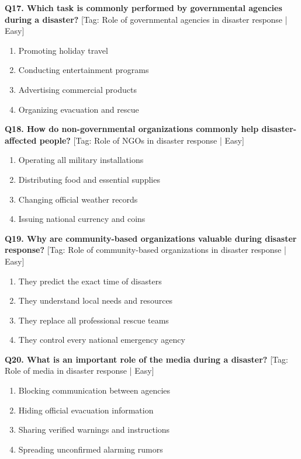 \noindent\textbf{Q17. Which task is commonly performed by governmental agencies during a disaster?} \hfill [Tag: Role of governmental agencies in disaster response | Easy]
\begin{enumerate}[label=(\alph*),topsep=2pt,itemsep=1pt,partopsep=0pt,parsep=0pt]
    \item {Promoting holiday travel}
    \item {Conducting entertainment programs}
    \item {Advertising commercial products}
    \item {Organizing evacuation and rescue}
\end{enumerate}
\vspace{2mm}

\noindent\textbf{Q18. How do non-governmental organizations commonly help disaster-affected people?} \hfill [Tag: Role of NGOs in disaster response | Easy]
\begin{enumerate}[label=(\alph*),topsep=2pt,itemsep=1pt,partopsep=0pt,parsep=0pt]
    \item {Operating all military installations}
    \item {Distributing food and essential supplies}
    \item {Changing official weather records}
    \item {Issuing national currency and coins}
\end{enumerate}
\vspace{2mm}

\noindent\textbf{Q19. Why are community-based organizations valuable during disaster response?} \hfill [Tag: Role of community-based organizations in disaster response | Easy]
\begin{enumerate}[label=(\alph*),topsep=2pt,itemsep=1pt,partopsep=0pt,parsep=0pt]
    \item {They predict the exact time of disasters}
    \item {They understand local needs and resources}
    \item {They replace all professional rescue teams}
    \item {They control every national emergency agency}
\end{enumerate}
\vspace{2mm}

\noindent\textbf{Q20. What is an important role of the media during a disaster?} \hfill [Tag: Role of media in disaster response | Easy]
\begin{enumerate}[label=(\alph*),topsep=2pt,itemsep=1pt,partopsep=0pt,parsep=0pt]
    \item {Blocking communication between agencies}
    \item {Hiding official evacuation information}
    \item {Sharing verified warnings and instructions}
    \item {Spreading unconfirmed alarming rumors}
\end{enumerate}
\vspace{2mm}


